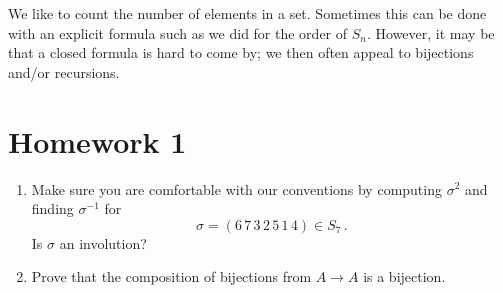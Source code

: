 We like to count the number of elements in a set.  Sometimes this can be done with an explicit formula
such as we did for the order of $S_n$.  However, it may be that a closed formula is hard to
come by; we then often appeal to bijections and/or recursions.  


\bigskip

\section*{\bf Homework 1}

\begin{enumerate}
\item Make sure you are comfortable with our conventions by computing $\sigma^2$ and
finding $\sigma^{-1}$ for
$$
\sigma = (6\,7\,3\,2\,5\,1\,4)\in S_7\,.
$$
Is $\sigma$ an involution?

\bigskip

\item Prove that the composition of bijections from $A\to A$ is a bijection.
\end{enumerate}









